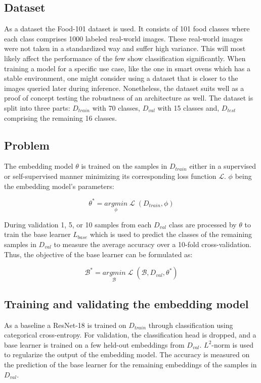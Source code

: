 \subsection{Dataset}
As a dataset the Food-101 dataset \cite{fleet_food-101_2014} is used. It consists of 101 food classes where 
each class comprises 1000 labeled real-world images. These real-world images were not taken in a standardized 
way and suffer high variance. This will most likely affect the performance of the few show classification 
significantly. When training a model for a specific use case, like the one in smart ovens which has a stable environment, one 
might consider using a dataset that is closer to the images queried later during inference. 
Nonetheless, the dataset suits well as a proof of concept testing the robustness of an architecture as well.
The dataset is split into three parts: $D_{train}$ with 70 classes,
$D_{val}$ with 15 classes and, $D_{test}$ comprising the remaining 16 classes.

\subsection{Problem}
The embedding model $\theta$ is trained on the samples in $D_{train}$ either in a supervised or self-supervised manner
minimizing its corresponding loss function $\mathcal{L}$. $\phi$ being the embedding model's parameters:

\begin{equation}
	\theta^*= \underset{\phi}{argmin}\;{\mathcal{L}\;(D_{train}, \phi)}
\end{equation}

During validation 1, 5, or 10 samples from each $D_{val}$ class are processed by $\theta$ to train the 
base learner $L_{base}$ which is used to predict the classes of the remaining samples in $D_{val}$ 
to measure the average accuracy over a 10-fold cross-validation. 
Thus, the objective of the base learner can be formulated as:

\begin{equation}
	\mathcal{B}^* = \underset{\mathcal{B}}{argmin}\;{\mathcal{L}\;(\mathcal{B}, D_{val}, \theta^*)}
\end{equation}

\subsection{Training and validating the embedding model}
As a baseline a ResNet-18 is trained on $D_{train}$ through classification using 
categorical cross-entropy. For validation, the classification 
head is dropped, and a base learner is trained on a few held-out embeddings from $D_{val}$. 
$L^2$-norm is used to regularize the output of the embedding model. The accuracy is 
measured on the prediction of the base learner for the remaining embeddings of the samples in $D_{val}$.

